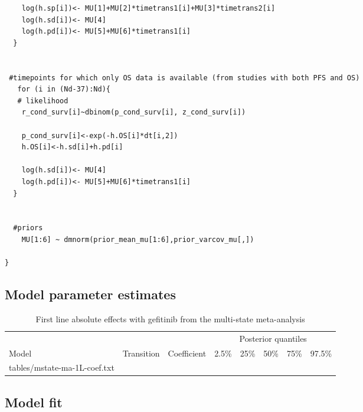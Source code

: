 \documentclass[11pt,final,fleqn]{article}\usepackage[]{graphicx}\usepackage[]{color}
\makeatletter
\theoremstyle{plain}
\newcommand*\ExpandableInput[1]{\@@input#1 }
\makeatother
\begin{document}
\begin{appendices}
\begin{verbatim}
    log(h.sp[i])<- MU[1]+MU[2]*timetrans1[i]+MU[3]*timetrans2[i] 
    log(h.sd[i])<- MU[4] 
    log(h.pd[i])<- MU[5]+MU[6]*timetrans1[i]
  }
  
  
 #timepoints for which only OS data is available (from studies with both PFS and OS)
   for (i in (Nd-37):Nd){
   # likelihood
    r_cond_surv[i]~dbinom(p_cond_surv[i], z_cond_surv[i]) 
    
    p_cond_surv[i]<-exp(-h.OS[i]*dt[i,2])
    h.OS[i]<-h.sd[i]+h.pd[i]
    
    log(h.sd[i])<- MU[4]
    log(h.pd[i])<- MU[5]+MU[6]*timetrans1[i]
  }
    
  
  #priors
    MU[1:6] ~ dmnorm(prior_mean_mu[1:6],prior_varcov_mu[,]) 
  
}

\end{verbatim}

\subsection{Model parameter estimates}

\begin{table}[!ht]
\begin{center}
\begin{threeparttable}
\footnotesize
\caption{First line absolute effects with gefitinib from the multi-state meta-analysis} \label{tbl:mstate-ma-1L-coef}
\begin{tabularx}{\textwidth}{@{\extracolsep{\fill}}lllrrrrr}
\hline
\multicolumn{3}{c}{} & \multicolumn{5}{c}{Posterior quantiles} \\
\cmidrule{4-8}
\multicolumn{1}{l}{Model} & \multicolumn{1}{l}{Transition} & \multicolumn{1}{l}{Coefficient}
& \multicolumn{1}{r}{2.5\%} & \multicolumn{1}{r}{25\%} & \multicolumn{1}{r}{50\%} & \multicolumn{1}{r}{75\%} & \multicolumn{1}{r}{97.5\%} \\
\hline
\ExpandableInput{tables/mstate-ma-1L-coef.txt}
\hline
\end{tabularx}
\scriptsize
\end{threeparttable}
\end{center}
\end{table}

\FloatBarrier

\subsection{Model fit}\label{app:DIC-1l}


\end{appendices}
\end{document}
